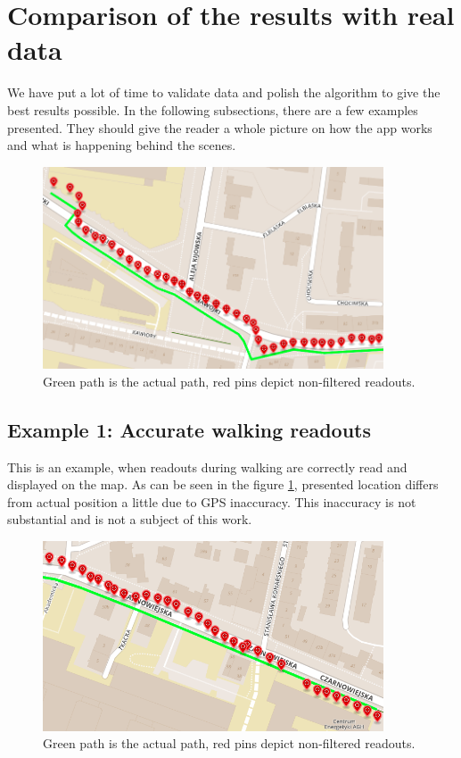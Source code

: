 \section{Comparison of the results with real data}

We have put a lot of time to validate data and polish the algorithm to give the best results possible. In the following subsections, there are a few examples presented. They should give the reader a whole picture on how the app works and what is happening behind the scenes.

\begin{figure}[]
    \includegraphics[width=0.9\textwidth]{images/1.png}
    \caption{Green path is the actual path, red pins depict non-filtered readouts.}
    \label{fig:screenexample1}
\end{figure}

\subsection{Example 1: Accurate walking readouts}

This is an example, when readouts during walking are correctly read and displayed on the map. As can be seen in the figure \ref{fig:screenexample1}, presented location differs from actual position a little due to GPS inaccuracy. This inaccuracy is not substantial and is not a subject of this work.

\begin{figure}[]
    \includegraphics[width=0.9\textwidth]{images/1-1.png}
    \caption{Green path is the actual path, red pins depict non-filtered readouts.}
    \label{fig:screenexample11}
\end{figure}

